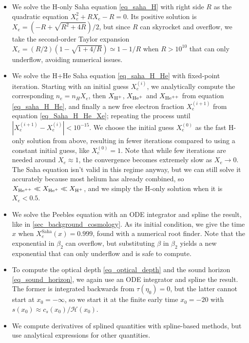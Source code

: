 \documentclass[10pt,a4paper]{article}
\begin{document}
\begin{itemize}
\item
We solve the H-only Saha equation \eqref{eq_saha_H}
with right side $R$
as the quadratic equation $X_e^2 + R X_e - R = 0$.
Its positive solution is $X_e = (-R + \sqrt{R^2+4R})/2$,
but since $R$ can skyrocket and overflow,
we take the second-order Taylor expansion $X_e = (R/2) (1 - \sqrt{1 + 4/R}) \simeq 1 - 1/R$
when $R > 10^{10}$ that can only underflow, avoiding numerical issues.

\item
We solve the H+He Saha equation \eqref{eq_saha_H_He} with fixed-point iteration.
Starting with an initial guess $X_e^{(i)}$,
we analytically compute the corresponding $n_e = n_H X_e$,
then $X_{\text{H}^+}$, $X_{\text{He}^+}$ and $X_{\text{He}^{++}}$ from equation \eqref{eq_saha_H_He},
and finally a new free electron fraction $X_e^{(i+1)}$ from equation \eqref{eq_Saha_H_He_Xe};
repeating the process until $|X_e^{(i+1)}-X_e^{(i)}| < 10^{-15}$.
We choose the initial guess $X_e^{(0)}$ as the fast H-only solution from above,
resulting in fewer iterations compared to using a constant initial guess, like $X_e^{(0)} = 1$.
Note that while few iterations are needed around $X_e \approx 1$,
the convergence becomes extremely slow as $X_e \rightarrow 0$.
The Saha equation isn't valid in this regime anyway,
but we can still solve it accurately because most helium has already combined,
so $X_{\text{He}^{++}} \ll X_{\text{He}^+} \ll X_{\text{H}^+}$, and we simply the H-only solution when it is $X_e < 0.5$.

\item
We solve the Peebles equation with an ODE integrator and spline the result, like in \cref{sec_background_cosmology}.
As its initial condition, we give the time $x$ when $X_e^\text{Saha}(x) = 0.999$, found with a numerical root finder.
Note that the exponential in $\beta_2$ can overflow,
but substituting $\beta$ in $\beta_2$ yields a new exponential that can only underflow and is safe to compute.

\item
To compute the optical depth \eqref{eq_optical_depth} and the sound horizon \eqref{eq_sound_horizon},
we again use an ODE integrator and spline the result.
The former is integrated backwards from $\tau(\eta_0)=0$,
but the latter cannot start at $x_0 = -\infty$,
so we start it at the finite early time $x_0 = -20$ with $s(x_0) \approx c_s(x_0) / \mathcal{H}(x_0)$.

\item
We compute derivatives of splined quantities with spline-based methods,
but use analytical expressions for other quantities.
\end{itemize}
\end{document}
